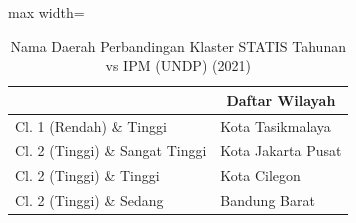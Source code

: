 \begin{table}[H]
\centering
\caption{Nama Daerah Perbandingan Klaster STATIS Tahunan vs IPM (UNDP) (2021)} \label{tab:sample1statis_ipm_name_2021}
\begin{adjustbox}{max width=\textwidth}
\begin{tabular}{|>{\centering\arraybackslash}p{4cm}|p{10cm}|}
\hline
\multicolumn{1}{|c|}{\textbf{Kategori}} & \multicolumn{1}{c|}{\textbf{Daftar Wilayah}} \\
\hline
Cl. 1 (Rendah) \& Tinggi & Kota Tasikmalaya \\
\hline
Cl. 2 (Tinggi) \& Sangat Tinggi & Kota Jakarta Pusat \\
\hline
Cl. 2 (Tinggi) \& Tinggi & Kota Cilegon \\
\hline
Cl. 2 (Tinggi) \& Sedang & Bandung Barat \\
\hline
\end{tabular}
\end{adjustbox}
\end{table}